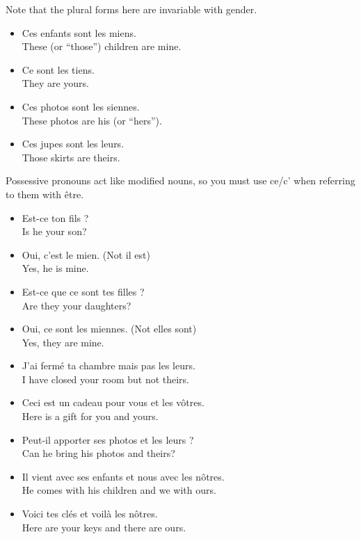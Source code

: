 Note that the plural forms here are invariable with gender.

\begin{itemize}
  \item  Ces enfants sont les miens. \\ These (or ``those'') children are mine.
	\item  Ce sont les tiens. \\ They are yours.
	\item  Ces photos sont les siennes. \\ These photos are his (or ``hers'').
	\item  Ces jupes sont les leurs. \\ Those skirts are theirs.
\end{itemize}

Possessive pronouns act like modified nouns, so you must use ce/c' when referring to them with {\^e}tre.

\begin{itemize}
  \item  Est-ce ton fils ? \\ Is he your son?
	\item  Oui, c'est le mien. (Not il est) \\ Yes, he is mine.
	\item  Est-ce que ce sont tes filles ? \\ Are they your daughters?
	\item  Oui, ce sont les miennes. (Not elles sont) \\ Yes, they are mine.
\end{itemize}

\begin{itemize}
  \item  J'ai ferm{\'e} ta chambre mais pas les leurs. \\ I have closed your room but not theirs.
	\item  Ceci est un cadeau pour vous et les v{\^o}tres. \\ Here is a gift for you and yours.
	\item  Peut-il apporter ses photos et les leurs ? \\ Can he bring his photos and theirs?
	\item  Il vient avec ses enfants et nous avec les n{\^o}tres. \\ He comes with his children and we with ours.
	\item  Voici tes cl{\'e}s et voil{\`a} les n{\^o}tres. \\ Here are your keys and there are ours.
\end{itemize}


